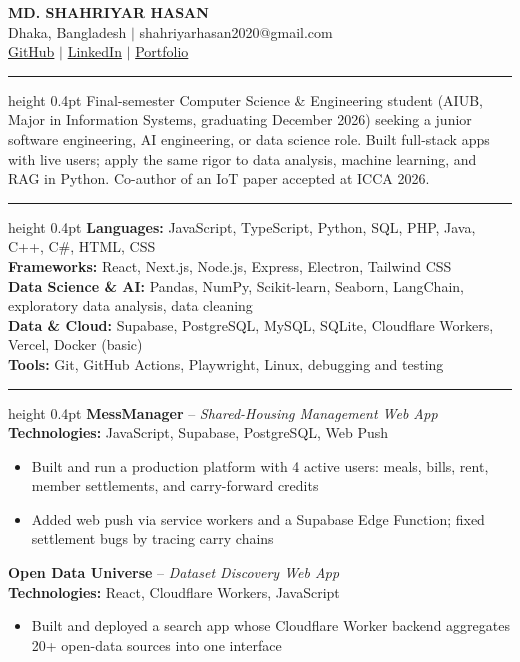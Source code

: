 \documentclass[10pt,letterpaper]{article}
\newcommand{\sect}[1]{\par\vspace{6pt}{\large\bfseries #1}\par\vspace{1pt}\hrule height 0.4pt\vspace{3pt}}
\newcommand{\project}[2]{\textbf{#1} -- \textit{#2}\\}
\newcommand{\tech}[1]{\textbf{Technologies:} #1\par\vspace{-1pt}}
\begin{document}
\begin{center}
  {\LARGE\bfseries MD. SHAHRIYAR HASAN}\\[2pt]
  {\small Dhaka, Bangladesh $|$ shahriyarhasan2020@gmail.com}\\[-1pt]
  {\small
    \href{https://github.com/ShahriyarH10}{GitHub} $|$
    \href{https://linkedin.com/in/md-shahriyar-hasan}{LinkedIn} $|$
    \href{https://shahriyarh10.github.io/s-hasan-portfolio/}{Portfolio}}
\end{center}

\sect{CAREER OBJECTIVE}
Final-semester Computer Science \& Engineering student (AIUB, Major in Information Systems, graduating December 2026)
seeking a junior software engineering, AI engineering, or data science role. Built full-stack apps with live users; apply the
same rigor to data analysis, machine learning, and RAG in Python. Co-author of an IoT paper accepted at ICCA 2026.

\sect{SKILLS}
\textbf{Languages:} JavaScript, TypeScript, Python, SQL, PHP, Java, C++, C\#, HTML, CSS\\
\textbf{Frameworks:} React, Next.js, Node.js, Express, Electron, Tailwind CSS\\
\textbf{Data Science \& AI:} Pandas, NumPy, Scikit-learn, Seaborn, LangChain, exploratory data analysis, data cleaning\\
\textbf{Data \& Cloud:} Supabase, PostgreSQL, MySQL, SQLite, Cloudflare Workers, Vercel, Docker (basic)\\
\textbf{Tools:} Git, GitHub Actions, Playwright, Linux, debugging and testing

\sect{PROJECTS}
\project{MessManager}{Shared-Housing Management Web App}
\tech{JavaScript, Supabase, PostgreSQL, Web Push}
\begin{itemize}
  \item Built and run a production platform with 4 active users: meals, bills, rent, member settlements, and carry-forward credits
  \item Added web push via service workers and a Supabase Edge Function; fixed settlement bugs by tracing carry chains
\end{itemize}

\project{Open Data Universe}{Dataset Discovery Web App}
\tech{React, Cloudflare Workers, JavaScript}
\begin{itemize}
  \item Built and deployed a search app whose Cloudflare Worker backend aggregates 20+ open-data sources into one interface
\end{itemize}
\end{document}

